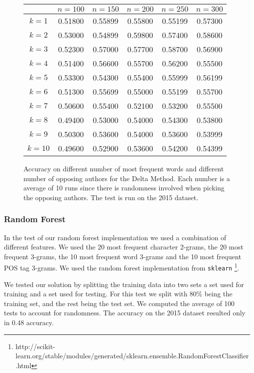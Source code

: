 \begin{figure}
    \centering
    \begin{tabular}{c|ccccc}
               & $n=100$ & $n=150$ & $n=200$ & $n=250$ & $n=300$ \\
        \hline
        $k=1$  & 0.51800 & 0.55899 & 0.55800 & 0.55199 & 0.57300 \\
        $k=2$  & 0.53000 & 0.54899 & 0.59800 & 0.57400 & 0.58600 \\
        $k=3$  & 0.52300 & 0.57000 & 0.57700 & 0.58700 & 0.56900 \\
        $k=4$  & 0.51400 & 0.56600 & 0.55700 & 0.56200 & 0.55500 \\
        $k=5$  & 0.53300 & 0.54300 & 0.55400 & 0.55999 & 0.56199 \\
        $k=6$  & 0.51300 & 0.55699 & 0.55000 & 0.55199 & 0.55700 \\
        $k=7$  & 0.50600 & 0.55400 & 0.52100 & 0.53200 & 0.55500 \\
        $k=8$  & 0.49400 & 0.53000 & 0.54000 & 0.54300 & 0.53800 \\
        $k=9$  & 0.50300 & 0.53600 & 0.54000 & 0.53600 & 0.53999 \\
        $k=10$ & 0.49600 & 0.52900 & 0.53600 & 0.54200 & 0.54399
    \end{tabular}
    \caption{Accuracy on different number of most frequent words and different
        number of opposing authors for the Delta Method. Each number is a
        average of 10 runs since there is randomness involved when picking the
        opposing authors. The test is run on the 2015 dataset.}
    \label{fig:delta_pan_2015_res}
\end{figure}

\subsubsection{Random Forest}
In the test of our random forest implementation we used a combination
of different features. We used the 20 most frequent character
2-grams, the 20 most frequent 3-grams, the 10 most frequent
word 3-grams and the 10 most frequent \gls{POS} tag 3-grams.
We used the random forest implementation from \texttt{sklearn}
\footnote{http://scikit-learn.org/stable/modules/generated/sklearn.ensemble.RandomForestClassifier.html}.

We tested our solution by splitting the training data into two sets a set used
for training and a set used for testing. For this test we split with 80\% being
the training set, and the rest being the test set. We computed the average of
100 tests to account for randomness. The accuracy on the 2015 dataset resulted
only in 0.48 accuracy.
